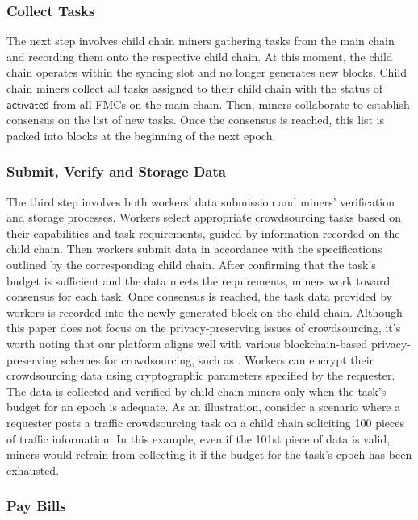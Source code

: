 \documentclass[10pt,journal]{IEEEtran}
\begin{document}
\subsubsection{\textbf{Collect Tasks}}\label{collect_tasks}

The next step involves child chain miners gathering tasks from the main chain and recording them onto the respective child chain. At this moment, the child chain operates within the syncing slot and no longer generates new blocks. Child chain miners collect all tasks assigned to their child chain with the status of $\mathsf{activated}$ from all FMCs on the main chain. Then, miners collaborate to establish consensus on the list of new tasks. Once the consensus is reached, this list is packed into blocks at the beginning of the next epoch.

\subsubsection{\textbf{Submit, Verify and Storage Data}}

The third step involves both workers' data submission and miners' verification and storage processes. Workers select appropriate crowdsourcing tasks based on their capabilities and task requirements, guided by information recorded on the child chain. Then workers submit data in accordance with the specifications outlined by the corresponding child chain. After confirming that the task's budget is sufficient and the data meets the requirements, miners work toward consensus for each task. Once consensus is reached, the task data provided by workers is recorded into the newly generated block on the child chain. Although this paper does not focus on the privacy-preserving issues of crowdsourcing, it's worth noting that our platform aligns well with various blockchain-based privacy-preserving schemes for crowdsourcing, such as \cite{wang2022triple,cai2019towards,koutsos2021agora}. Workers can encrypt their crowdsourcing data using cryptographic parameters specified by the requester. The data is collected and verified by child chain miners only when the task's budget for an epoch is adequate. As an illustration, consider a scenario where a requester posts a traffic crowdsourcing task on a child chain soliciting 100 pieces of traffic information. In this example, even if the 101st piece of data is valid, miners would refrain from collecting it if the budget for the task's epoch has been exhausted.

\subsubsection{\textbf{Pay Bills}}\label{pay_bills}
\end{document}

